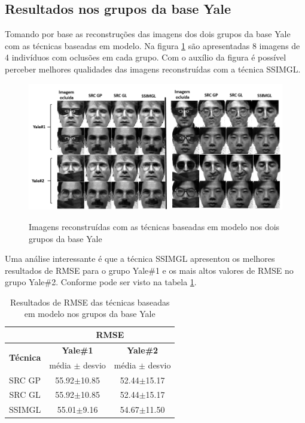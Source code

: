\subsection{Resultados nos grupos da base Yale}

Tomando por base as reconstruções das imagens dos dois grupos da base Yale com as técnicas baseadas em modelo. Na figura \ref{fig:reconstrucoes_yale} são apresentadas 8 imagens de 4 indivíduos com oclusões em cada grupo. Com o auxílio da figura é possível perceber melhores qualidades das imagens reconstruídas com a técnica SSIMGL.

\begin{figure}[H]
\centering
\caption{Imagens reconstruídas com as técnicas baseadas em modelo nos dois grupos da base Yale}
\includegraphics[scale=0.55]{imgs4/reconstrucoes_modelo_yale}
\label{fig:reconstrucoes_yale}
\end{figure}

Uma análise interessante é que a técnica SSIMGL apresentou os melhores resultados de RMSE para o grupo Yale\#1 e os mais altos valores de RMSE no grupo Yale\#2. Conforme pode ser visto na tabela \ref{tab:RMSE_modelo_Yale}.


\begin{table}[H]
\caption{Resultados de RMSE das técnicas baseadas em modelo nos grupos da base Yale}
\centering
\begin{tabular}{|c|c|c|}
\cline{2-3}
 \multicolumn{1}{c|}{} & \multicolumn{2}{c|}{\textbf{RMSE}}\\ \hline
\multicolumn{1}{|c|}{\multirow{2}{*}{\textbf{Técnica} }}& \textbf{Yale\#1} &  \textbf{Yale\#2}   \\ \cline{2-3}

& média $\pm$ desvio & média $\pm$ desvio \\\hline 
SRC GP	&55.92$\pm$10.85&	52.44$\pm$15.17\\\hline
SRC GL	&55.92$\pm$10.85&	52.44$\pm$15.17\\\hline
SSIMGL	&55.01$\pm$9.16&	54.67$\pm$11.50\\\hline

\end{tabular}
\label{tab:RMSE_modelo_Yale}
\end{table}

